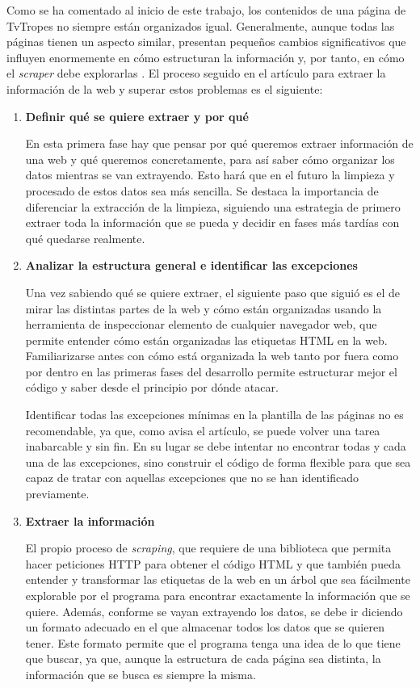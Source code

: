 Como se ha comentado al inicio de este trabajo, los contenidos de una página de
TvTropes no siempre están organizados igual. Generalmente, aunque todas las
páginas tienen un aspecto similar, presentan pequeños cambios significativos que
influyen enormemente en cómo estructuran la información y, por tanto, en cómo el
\textit{scraper} debe explorarlas \cite{nishalscraping}. El proceso seguido en
el artículo para extraer la información de la web y superar estos problemas es
el siguiente:
\begin{enumerate}
    \item \textbf{Definir qué se quiere extraer y por qué}
    
    En esta primera fase hay que pensar por qué queremos extraer información de
    una web y qué queremos concretamente, para así saber cómo organizar los
    datos mientras se van extrayendo. Esto hará que en el futuro la limpieza y
    procesado de estos datos sea más sencilla. Se destaca la importancia de
    diferenciar la extracción de la limpieza, siguiendo una estrategia de
    primero extraer toda la información que se pueda y decidir en fases más
    tardías con qué quedarse realmente.
    \item \textbf{Analizar la estructura general e identificar las excepciones}
    
    Una vez sabiendo qué se quiere extraer, el siguiente paso que siguió es el
    de mirar las distintas partes de la web y cómo están organizadas usando la
    herramienta de inspeccionar elemento de cualquier navegador web, que permite
    entender cómo están organizadas las etiquetas HTML en la web. Familiarizarse
    antes con cómo está organizada la web tanto por fuera como por dentro en las
    primeras fases del desarrollo permite estructurar mejor el código y saber
    desde el principio por dónde atacar.

    Identificar todas las excepciones mínimas en la plantilla de las páginas no
    es recomendable, ya que, como avisa el artículo, se puede volver una tarea
    inabarcable y sin fin. En su lugar se debe intentar no encontrar todas y
    cada una de las excepciones, sino construir el código de forma flexible para
    que sea capaz de tratar con aquellas excepciones que no se han identificado
    previamente.

    \item \textbf{Extraer la información}
    
    El propio proceso de \textit{scraping}, que requiere de una biblioteca que
    permita hacer peticiones HTTP para obtener el código HTML y que también
    pueda entender y transformar las etiquetas de la web en un árbol que sea
    fácilmente explorable por el programa para encontrar exactamente la
    información que se quiere. Además, conforme se vayan extrayendo los datos,
    se debe ir diciendo un formato adecuado en el que almacenar todos los datos
    que se quieren tener. Este formato permite que el programa tenga una idea de
    lo que tiene que buscar, ya que, aunque la estructura de cada página sea
    distinta, la información que se busca es siempre la misma.


\end{enumerate}
